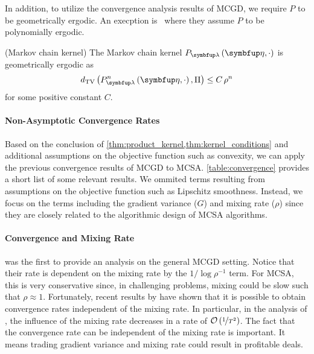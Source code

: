 In addition, to utilize the convergence analysis results of MCGD, we require \(P\) to be geometrically ergodic.
An execption is~\citet{debavelaere_convergence_2021} where they assume \(P\) to be polynomially ergodic.
\begin{assumption}{(Markov chain kernel)}\label{thm:kernel_conditions}
\vspace{-0.05in}
  The Markov chain kernel \(P_{\vlambda}\left(\veta, \cdot\right)\) is geometrically ergodic as
  {%
  \[
  \DTV{P_{\vlambda}^{n}\left(\veta, \cdot\right)}{ \Pi } \leq C \, \rho^{n}
  \]
  }
  for some positive constant \(C\).
\vspace{-0.05in}
\end{assumption}

\vspace{-0.05in}
\paragraph{Non-Asymptotic Convergence Rates}
Based on the conclusion of \cref{thm:product_kernel,thm:kernel_conditions} and additional assumptions on the objective function such as convexity, we can apply the previous convergence results of MCGD to MCSA.
\cref{table:convergence} provides a short list of some relevant results.
We ommited terms resulting from assumptions on the objective function such as Lipschitz smoothness.
Instead, we focus on the terms including the gradient variance (\(G\)) and mixing rate (\(\rho\)) since they are closely related to the algorithmic design of MCSA algorithms.

\vspace{-0.05in}
\paragraph{Convergence and Mixing Rate}
\citet{duchi_ergodic_2012} was the first to provide an analysis on the general MCGD setting.
Notice that their rate is dependent on the mixing rate by the \(1 / \log \rho^{-1}\) term.
For MCSA, this is very conservative since, in challenging problems, mixing could be slow such that \(\rho \approx 1\).
Fortunately, recent results by \citet{doan_convergence_2020,doan_finitetime_2020} have shown that it is possible to obtain convergence rates independent of the mixing rate.
In particular, in the analysis of \citet{doan_finitetime_2020}, the influence of the mixing rate decreases in a rate of \(\mathcal{O}\left(\nicefrac{1}{T^2}\right)\).
The fact that the convergence rate can be independent of the mixing rate is important.
It means trading gradient variance and mixing rate could result in profitable deals.

